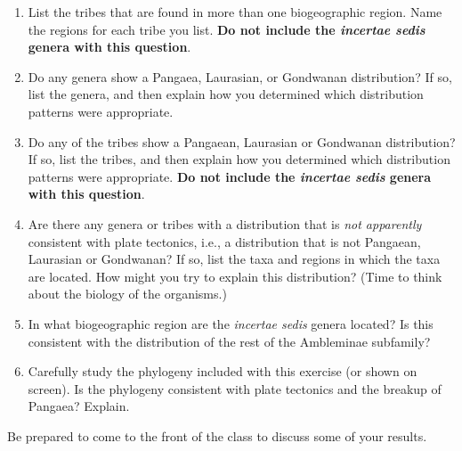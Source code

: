 \documentclass[11pt]{article}
\begin{document}
\begin{enumerate}[resume, leftmargin=*]
\begin{multicols}{2}
Least number of genera: \vspace{2\baselineskip}

 Greatest number of species: \vspace{2\baselineskip}
 
 Least number of species: \vspace{2\baselineskip}
 
 \end{multicols}
 
 \vspace{\baselineskip}
 
\item List the tribes that are found in more than one biogeographic region.
Name the regions for each tribe you list. \textbf{Do not include the
\textit{incertae sedis} genera with this question}.

\item Do any genera show a Pangaea, Laurasian, or Gondwanan distribution?
If so, list the genera, and then explain how you determined which
distribution patterns were appropriate.

\newpage

\item Do any of the tribes show a Pangaean, Laurasian or Gondwanan
distribution? If so, list the tribes, and then explain how you
determined which distribution patterns were appropriate. \textbf{Do not
include the \textit{incertae sedis} genera with this question}.

\item Are there any genera or tribes with a distribution that is \emph{not 
apparently} consistent with plate tectonics, i.e., a distribution
that is not Pangaean, Laurasian or Gondwanan? If so, list the taxa and
regions in which the taxa are located. How might you try to explain this
distribution? (Time to think about the biology of the organisms.)

\newpage

\item In what biogeographic region are the \textit{incertae sedis} genera
located? Is this consistent with the distribution of the rest of the
Ambleminae subfamily?

\item Carefully study the phylogeny included with this exercise (or shown
on screen). Is the phylogeny consistent with plate tectonics and the
breakup of Pangaea? Explain.

\end{enumerate}

Be prepared to come to the front of the class to discuss some of your
results.
\end{document}
